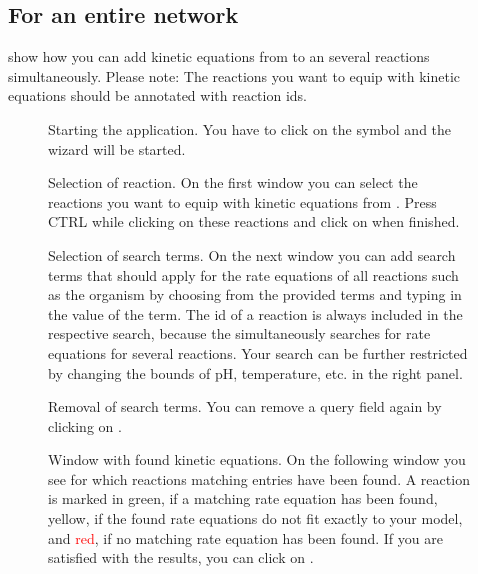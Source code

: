 \subsection{For an entire network}
 show how you can add kinetic equations from \SABIO to an several reactions simultaneously. Please note: The reactions you want to equip with kinetic equations should be annotated with \KEGG reaction ids.

\begin{figure}[htbp]
\caption[Starting the \SABIO application]{Starting the \SABIO application.
You have to click on the \SABIO symbol and the wizard will be started.}
\label{fig:startAutomatic}
\end{figure}

\begin{figure}[htbp]
\caption[Selection of reaction]{Selection of reaction.
On the first window you can select the reactions you want to equip with kinetic equations from \SABIO. 
Press CTRL%
while clicking on these reactions and click on  when finished.}
\label{fig:selectReations}
\end{figure}

\begin{figure}[htbp]
\caption[Selection of search terms]{Selection of search terms.
On the next window you can add search terms
that should apply for the rate equations of all reactions such as the organism
by choosing from the provided terms and typing in the value of the term.
The \KEGG id of a reaction is always included in the respective search,
because the \API simultaneously searches for rate equations for several reactions.
Your search can be further restricted by changing the bounds of pH, temperature,
etc. in the right panel.}
\label{fig:searchTerms}
\end{figure}

\begin{figure}[htbp]
\caption[Removal of search terms]{Removal of search terms.
You can remove a query field again by clicking on .}
\label{fig:removeSearchTerms}
\end{figure}

\begin{figure}[htbp]
\caption[Window with found kinetic equations]{Window with found kinetic equations.
On the following window you see for which reactions matching entries have been found.
A reaction is marked in green, if a matching rate equation has been found, yellow,
if the found rate equations do not fit exactly to your model, and \textcolor{red}{red}, if no matching
rate equation has been found. If you are satisfied with the results, you can click on .}
\label{fig:foundEquations}
\end{figure}


